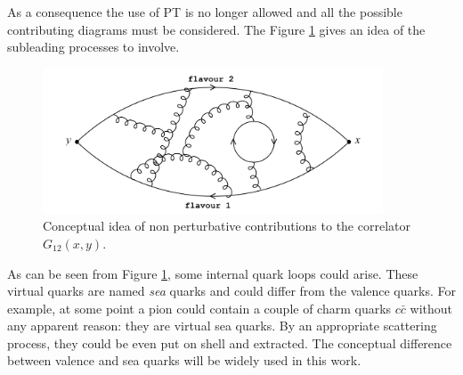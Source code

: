\documentclass[english, LaM, oneside, noexaminfo]{sapthesis}
\begin{document}
As a consequence the use of PT is no longer allowed and all the possible contributing diagrams must be considered.
The Figure \ref{fig:confinement} gives an idea of the subleading processes to involve.
\begin{figure}[h!]
    \centering
    \includegraphics[width=0.9\textwidth]{imgs-MSc-thesis/confinement.png}
    \caption{Conceptual idea of non perturbative contributions to the correlator $G_{12}(x,y)$.}
    \label{fig:confinement}
\end{figure}
\newline
As can be seen from Figure \ref{fig:confinement}, some internal quark loops could arise.
These virtual quarks are named {\it sea} quarks and could differ from the valence quarks.
For example, at some point a pion could contain a couple of charm quarks $c\bar c$ without any apparent reason: they are virtual sea quarks.
By an appropriate scattering process, they could be even put on shell and extracted.
The conceptual difference between valence and sea quarks will be widely used in this work.
\end{document}
